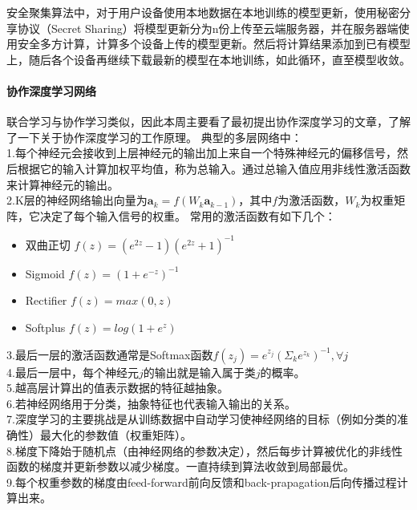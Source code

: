 \documentclass[a4paper]{article}
\begin{document}
安全聚集算法中，对于用户设备使用本地数据在本地训练的模型更新，使用秘密分享协议（Secret Sharing）将模型更新分为n份上传至云端服务器，并在服务器端使用安全多方计算，计算多个设备上传的模型更新。然后将计算结果添加到已有模型上，随后各个设备再继续下载最新的模型在本地训练，如此循环，直至模型收敛。


\paragraph{协作深度学习网络}
联合学习与协作学习类似，因此本周主要看了最初提出协作深度学习的文章\cite{shokri2015privacy}，了解了一下关于协作深度学习的工作原理。
典型的多层网络中：\\
1.每个神经元会接收到上层神经元的输出加上来自一个特殊神经元的偏移信号，然后根据它的输入计算加权平均值，称为总输入。通过总输入值应用非线性激活函数来计算神经元的输出。\\
2.K层的神经网络输出向量为$\bm{a}_k=f(W_k\bm{a}_{k-1})$，其中$f$为激活函数，$W_k$为权重矩阵，它决定了每个输入信号的权重。
常用的激活函数有如下几个：
\begin{itemize}
\item 双曲正切 $f(z)=(e^{2z}-1)(e^{2z}+1)^{-1}$
\item Sigmoid $f(z)=(1+e^{-z})^{-1}$
\item Rectifier $f(z)=max(0,z)$
\item Softplus $f(z)=log(1+e^z)$
\end{itemize}
3.最后一层的激活函数通常是Softmax函数$f(z_j)=e^{z_j}(\Sigma_ke^{z_k})^{-1},\forall j$ \\
4.最后一层中，每个神经元$j$的输出就是输入属于类$j$的概率。\\
5.越高层计算出的值表示数据的特征越抽象。\\
6.若神经网络用于分类，抽象特征也代表输入输出的关系。\\
7.深度学习的主要挑战是从训练数据中自动学习使神经网络的目标（例如分类的准确性）最大化的参数值（权重矩阵）。\\
8.梯度下降始于随机点（由神经网络的参数决定），然后每步计算被优化的非线性函数的梯度并更新参数以减少梯度。一直持续到算法收敛到局部最优。\\
9.每个权重参数的梯度由feed-forward前向反馈和back-prapagation后向传播过程计算出来。
\end{document}
